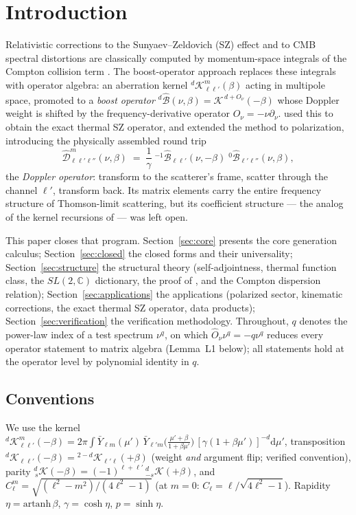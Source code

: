 \documentclass[useAMS,usenatbib]{article}
\newcommand{\Oh}{\hat{O}_\nu}
\newcommand{\Kk}{\mathcal{K}}
\newcommand{\Bo}{\hat{\mathcal{B}}}
\newcommand{\Do}{\hat{\mathcal{D}}}
\newcommand{\dd}{\mathrm{d}}
\begin{document}
\section{Introduction}
Relativistic corrections to the Sunyaev--Zeldovich (SZ) effect and to CMB spectral distortions are classically
computed by momentum-space integrals of the Compton collision term \citep{Nozawa1998,SZpack}. The boost-operator
approach \citep{CR25} replaces these integrals with operator algebra: an aberration kernel
${}^{d}\Kk^m_{\ell\ell'}(\beta)$ acting in multipole space, promoted to a \emph{boost operator}
${}^{d}\Bo(\nu,\beta) = \Kk^{\,d+\Oh}(-\beta)$ whose Doppler weight is shifted by the frequency-derivative
operator $\Oh = -\nu\partial_\nu$. \citet{CR26} used this to obtain the exact thermal SZ operator, and
\citet{RC26} extended the method to polarization, introducing the physically assembled round trip
\begin{equation}
  \Do^m_{\ell\ell'\ell''}(\nu,\beta)
  \;=\;\frac{1}{\gamma}\;{}^{-1}\Bo_{\ell\ell'}(\nu,-\beta)\;{}^{0}\Bo_{\ell'\ell''}(\nu,\beta),
  \label{eq:dop}
\end{equation}
the \emph{Doppler operator}: transform to the scatterer's frame, scatter through the channel $\ell'$, transform
back. Its matrix elements carry the entire frequency structure of Thomson-limit scattering, but its
coefficient structure --- the analog of the kernel recursions of \citet{DC14,CR25} --- was left open.

This paper closes that program. Section~\ref{sec:core} presents the core generation calculus; %
Section~\ref{sec:closed} the closed forms and their universality; Section~\ref{sec:structure} the structural
theory (self-adjointness, thermal function class, the $SL(2,\mathbb C)$ dictionary, the proof of
\citealt[Eq.~20]{RC26}, and the Compton dispersion relation); Section~\ref{sec:applications} the applications
(polarized sector, kinematic corrections, the exact thermal SZ operator, data products);
Section~\ref{sec:verification} the verification methodology. Throughout, $q$ denotes the power-law index of a
test spectrum $\nu^q$, on which $\Oh\nu^q = -q\nu^q$ reduces every operator statement to matrix algebra
(Lemma~L1 below); all statements hold at the operator level by polynomial identity in $q$.

\subsection*{Conventions}
We use the kernel
${}^{d}\Kk^m_{\ell\ell'}(-\beta) = 2\pi\int \bar Y_{\ell m}(\mu')\,\bar Y_{\ell'm}\!\big(\tfrac{\mu'+\beta}{1+\beta\mu'}\big)\,
[\gamma(1+\beta\mu')]^{-d}\dd\mu'$, transposition
${}^{d}\Kk_{\ell\ell'}(-\beta) = {}^{2-d}\Kk_{\ell'\ell}(+\beta)$ (weight \emph{and} argument flip; verified
convention), parity ${}^{d}_{\,s}\Kk(-\beta) = (-1)^{\ell+\ell'}\,{}^{d}_{-s}\Kk(+\beta)$, and
$C^m_\ell = \sqrt{(\ell^2-m^2)/(4\ell^2-1)}$ (at $m=0$: $C_\ell = \ell/\sqrt{4\ell^2-1}$). Rapidity
$\eta = \mathrm{artanh}\,\beta$, $\gamma = \cosh\eta$, $p = \sinh\eta$.
\end{document}
